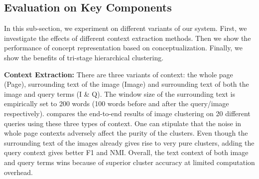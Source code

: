 

\subsection{Evaluation on Key Components}
In this sub-section, we experiment on different variants of our
system. First, we investigate the effects of different context
extraction methods. Then we show the performance of concept
representation based on conceptualization. Finally, we show the benefits of
tri-stage hierarchical clustering.

\textbf{Context Extraction:}
\label{sec:contexteval}
There are three variants of context: the whole page (Page),
surrounding text of the image (Image) and surrounding text of both
the image and query terms (I \& Q).
The window size of the surrounding text is empirically set to 200 words (100 words
before and after the query/image respectively).
 compares the end-to-end results of
image clustering on 20 different queries using
these three types of context.
One can stipulate that the noise in whole page contexts adversely affect
the purity of the clusters.
Even though the surrounding text of the images already
gives rise to very pure clusters, adding the query context gives
better F1 and NMI. Overall, the text context of both image and query terms
wins because of superior cluster accuracy at limited computation overhead.

